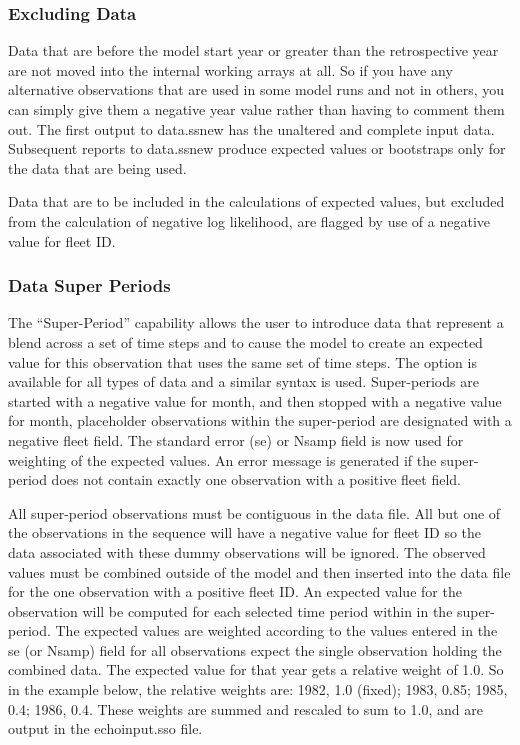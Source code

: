 \subsubsection{Excluding Data}
Data that are before the model start year or greater than the retrospective year are not moved into the internal working arrays at all.  So if you have any alternative observations that are used in some model runs and not in others, you can simply give them a negative year value rather than having to comment them out. The first output to data.ss\textunderscore new has the unaltered and complete input data.  Subsequent reports to data.ss\textunderscore new produce expected values or bootstraps only for the data that are being used.

Data that are to be included in the calculations of expected values, but excluded from the calculation of negative log likelihood, are flagged by use of a negative value for fleet ID.

\subsubsection{Data Super Periods}
The “Super-Period” capability allows the user to introduce data that represent a blend across a set of time steps and to cause the model to create an expected value for this observation that uses the same set of time steps.  The option is available for all types of data and a similar syntax is used.  Super-periods are started with a negative value for month, and then stopped with a negative value for month, placeholder observations within the super-period are designated with a negative fleet field.  The standard error (se) or Nsamp field is now used for weighting of the expected values.  An error message is generated if the super-period does not contain exactly one observation with a positive fleet field.

All super-period observations must be contiguous in the data file.  All but one of the observations in the sequence will have a negative value for fleet ID so the data associated with these dummy observations will be ignored. The observed values must be combined outside of the model and then inserted into the data file for the one observation with a positive fleet ID.
An expected value for the observation will be computed for each selected time period within in the super-period.  The expected values are weighted according to the values entered in the se (or Nsamp) field for all observations expect the single observation holding the combined data.  The expected value for that year gets a relative weight of 1.0.  So in the example below, the relative weights are:  1982, 1.0 (fixed); 1983, 0.85; 1985, 0.4; 1986, 0.4.  These weights are summed and rescaled to sum to 1.0, and are output in the echoinput.sso file.

